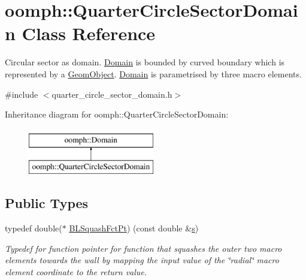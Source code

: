 \hypertarget{classoomph_1_1QuarterCircleSectorDomain}{}\section{oomph\+:\+:Quarter\+Circle\+Sector\+Domain Class Reference}
\label{classoomph_1_1QuarterCircleSectorDomain}


Circular sector as domain. \hyperlink{classoomph_1_1Domain}{Domain} is bounded by curved boundary which is represented by a \hyperlink{classoomph_1_1GeomObject}{Geom\+Object}. \hyperlink{classoomph_1_1Domain}{Domain} is parametrised by three macro elements.  




{\ttfamily \#include $<$quarter\+\_\+circle\+\_\+sector\+\_\+domain.\+h$>$}

Inheritance diagram for oomph\+:\+:Quarter\+Circle\+Sector\+Domain\+:\begin{figure}[H]
\begin{center}
\leavevmode
\includegraphics[height=2.000000cm]{classoomph_1_1QuarterCircleSectorDomain}
\end{center}
\end{figure}
\subsection*{Public Types}
\begin{DoxyCompactItemize}
\item 
typedef double($\ast$ \hyperlink{classoomph_1_1QuarterCircleSectorDomain_a6cffab57f87c9f4ab01744647240bb1e}{B\+L\+Squash\+Fct\+Pt}) (const double \&\hyperlink{cfortran_8h_ab7123126e4885ef647dd9c6e3807a21c}{s})
\begin{DoxyCompactList}\small\item\em Typedef for function pointer for function that squashes the outer two macro elements towards the wall by mapping the input value of the \char`\"{}radial\char`\"{} macro element coordinate to the return value. \end{DoxyCompactList}\end{DoxyCompactItemize}
